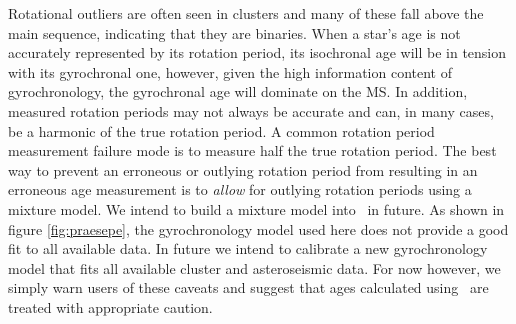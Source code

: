 Rotational outliers are often seen in clusters \citep[see \eg][]{douglas2016,
rebull2016, douglas2017, rebull2017} and many of these fall above the main
sequence, indicating that they are binaries.
When a star's age is not accurately represented by its rotation period, its
isochronal age will be in tension with its gyrochronal one, however, given the
high information content of gyrochronology, the gyrochronal age will dominate
on the MS.
In addition, measured rotation periods may not always be accurate and can, in
many cases, be a harmonic of the true rotation period.
A common rotation period measurement failure mode is to measure half the true
rotation period.
The best way to prevent an erroneous or outlying rotation period from
resulting in an erroneous age measurement is to {\it allow} for outlying
rotation periods using a mixture model.
We intend to build a mixture model into \sd\ in future.
As shown in figure \ref{fig:praesepe}, the gyrochronology model used here
\citep{angus2015} does not provide a good fit to all available data.
In future we intend to calibrate a new gyrochronology model that fits all
available cluster and asteroseismic data.
For now however, we simply warn users of these caveats and suggest that ages
calculated using \sd\ are treated with appropriate caution.


